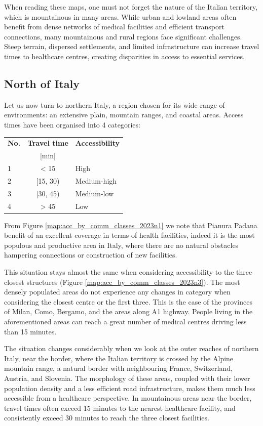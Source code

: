 When reading these maps, one must not forget the nature of the Italian territory, which is mountainous in many areas.
While urban and lowland areas often benefit from dense networks of medical facilities and efficient transport connections, many mountainous and rural regions face significant challenges. 
Steep terrain, dispersed settlements, and limited infrastructure can increase travel times to healthcare centres, creating disparities in access to essential services. 


\subsection{North of Italy}

Let us now turn to northern Italy, a region chosen for its wide range of environments: an extensive plain, mountain ranges, and coastal areas.
Access times have been organised into 4 categories:
\begin{center}
\begin{tabular}{l c l}
	\toprule
	\textbf{No.} & \textbf{Travel time} & \textbf{Accessibility}\\
	& [min] & \\
	\midrule
	1 & < 15 & High\\
	2 & [15, 30) & Medium-high\\
	3 & [30, 45) & Medium-low\\
	4 & > 45 & Low\\
	\bottomrule
\end{tabular}
\end{center}
\medskip

From Figure \ref{map:acc_by_comm_classes_2023n1} we note that Pianura Padana benefit of an excellent coverage in terms of health facilities, indeed it is the most populous and productive area in Italy, where there are no natural obstacles hampering connections or construction of new facilities.

This situation stays almost the same when considering accessibility to the three closest structures (Figure \ref{map:acc_by_comm_classes_2023n3}).
The most densely populated areas do not experience any changes in category when considering the closest centre or the first three. 
This is the case of the provinces of Milan, Como, Bergamo, and the areas along A1 highway. 
People living in the aforementioned areas can reach a great number of medical centres driving less than 15 minutes.

The situation changes considerably when we look at the outer reaches of northern Italy, near the border, where the Italian territory is crossed by the Alpine mountain range, a natural border with neighbouring France, Switzerland, Austria, and Slovenia.
The morphology of these areas, coupled with their lower population density and a less efficient road infrastructure, makes them much less accessible from a healthcare perspective.
In mountainous areas near the border, travel times often exceed 15 minutes to the nearest healthcare facility, and consistently exceed 30 minutes to reach the three closest facilities.


